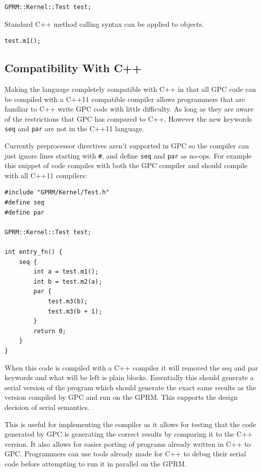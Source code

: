 \begin{lstlisting}[style=myGPC]
GPRM::Kernel::Test test;
\end{lstlisting}

Standard C++ method calling syntax can be applied to objects.
\begin{lstlisting}[style=myGPC]
test.m1();
\end{lstlisting}



\subsection{Compatibility With C++}
Making the language completely compatible with C++ in that all GPC code can be
compiled with a C++11 compatible compiler allows programmers that are familiar to
C++ write GPC code with little difficulty. As long as they are aware of the restrictions
that GPC has compared to C++. However the new keywords \texttt{seq} and \texttt{par} are not 
in the C++11 language.

Currently preprocessor directives aren't supported in GPC so the compiler can
just ignore lines starting with \texttt{\#}, and define \texttt{seq} and \texttt{par} as no-ops. 
For example this snippet of code compiles with both the GPC compiler and 
should compile with all C++11 compilers:

\begin{lstlisting}[style=myGPC]
#include "GPRM/Kernel/Test.h"
#define seq
#define par

GPRM::Kernel::Test test;

int entry_fn() {
    seq {
        int a = test.m1();
        int b = test.m2(a);        
        par {
            test.m3(b);
            test.m3(b + 1);
        }
        return 0;
    }
}
\end{lstlisting}

When this code is compiled with a C++ compiler it will removed the seq and par
keywords and what will be left is plain blocks. Essentially this should generate a
serial version of the program which should generate the exact same results
as the version compiled by GPC and run on the GPRM. This supports the 
design decision of serial semantics.

This is useful for implementing the compiler as it allows for
testing that the code generated by GPC is generating the correct results
by comparing it to the C++ version. It also allows for easier porting of
programs already written in C++ to GPC. Programmers can use tools
already made for C++ to debug their serial code before attempting
to run it in parallel on the GPRM.

